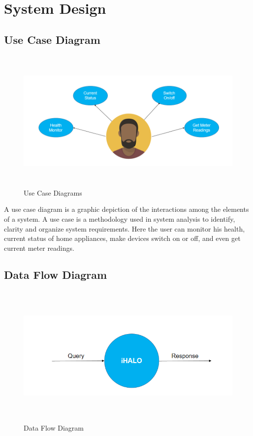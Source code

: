 \chapter{System Design}
\thispagestyle{fancy}
\section{Use Case Diagram}

\begin{figure}[H]
	
	\centering
	\includegraphics[width=\linewidth,height=7cm] {./images/p1.png}
	\caption{Use Case Diagrams}
	\label{manual}
\end{figure}
A use case diagram is a graphic depiction of the interactions among the elements of a system. A use case is a methodology used in system analysis to identify, clarity and organize system requirements. Here the user can monitor his health, current status of home appliances, make devices switch on or off, and even get current meter readings.
\section{Data Flow Diagram}
\begin{figure}[H]
	
	\centering
	\includegraphics[width=\linewidth,height=7cm] {./images/p2.png}
	\caption{Data Flow Diagram}
	\label{manual}
\end{figure}

